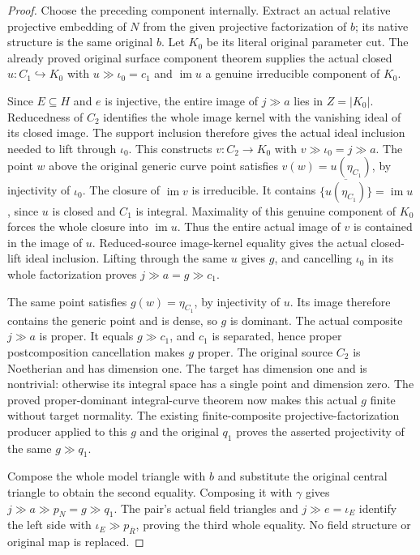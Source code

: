 \begin{proof}
Choose the preceding component internally. Extract an actual relative
projective embedding of $N$ from the given projective factorization
of $b$; its native structure is the same original $b$. Let $K_0$ be
its literal original parameter cut. The already proved original
surface component theorem supplies the actual closed
$u:C_1\hookrightarrow K_0$ with $u\gg\iota_0=c_1$ and
$\operatorname{im}u$ a genuine irreducible component of $K_0$.

Since $E\subseteq H$ and $e$ is injective, the entire image of
$j\gg a$ lies in $Z=|K_0|$. Reducedness of $C_2$ identifies the
whole image kernel with the vanishing ideal of its closed image.
The support inclusion therefore gives the actual ideal inclusion
needed to lift through $\iota_0$. This constructs
$v:C_2\to K_0$ with $v\gg\iota_0=j\gg a$.
The point $w$ above the original generic curve point satisfies
$v(w)=u(\eta_{C_1})$, by injectivity of $\iota_0$.
The closure of $\operatorname{im}v$ is irreducible. It contains
$\overline{\{u(\eta_{C_1})\}}=\operatorname{im}u$, since $u$ is
closed and $C_1$ is integral. Maximality of this genuine component
of $K_0$ forces the whole closure into $\operatorname{im}u$.
Thus the entire actual image of $v$ is contained in the image of $u$.
Reduced-source image-kernel equality gives the actual closed-lift
ideal inclusion. Lifting through the same $u$ gives $g$, and cancelling
$\iota_0$ in its whole factorization proves $j\gg a=g\gg c_1$.

The same point satisfies $g(w)=\eta_{C_1}$, by injectivity of $u$.
Its image therefore contains the generic point and is dense, so $g$
is dominant. The actual composite $j\gg a$ is proper. It equals
$g\gg c_1$, and $c_1$ is separated, hence proper postcomposition
cancellation makes $g$ proper. The original source $C_2$ is
Noetherian and has dimension one. The target has dimension one
and is nontrivial: otherwise its integral space has a single point
and dimension zero. The proved proper-dominant integral-curve
theorem now makes this actual $g$ finite without target normality.
The existing finite-composite projective-factorization producer
applied to this $g$ and the original $q_1$ proves the asserted
projectivity of the same $g\gg q_1$.

Compose the whole model triangle with $b$ and substitute the
original central triangle to obtain the second equality. Composing
it with $\gamma$ gives $j\gg a\gg p_N=g\gg q_1$.
The pair's actual field triangles and $j\gg e=\iota_E$ identify
the left side with $\iota_E\gg p_{\overline R}$, proving the
third whole equality. No field structure or original map is replaced.
\end{proof}

